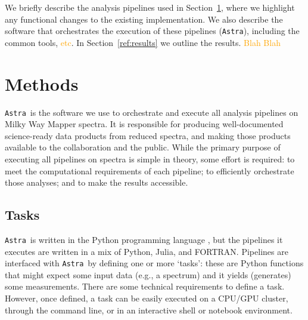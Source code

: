 \documentclass[modern]{aastex631}
\newcommand{\astra}{\texttt{Astra}}
\newcommand{\Astra}{\astra}
\newcommand{\todo}[1]{\textcolor{orange}{#1}}
\begin{document}
We briefly describe the analysis pipelines used in Section~\ref{sec:method}, where we highlight any functional changes to the existing implementation. We also describe the software that orchestrates the execution of these pipelines (\texttt{Astra}), including the common tools, \todo{etc}. In Section~\ref{ref:results} we outline the results. \todo{Blah Blah}

\section{Methods}\label{sec:method}

\Astra\ is the software we use to orchestrate and execute all analysis pipelines on Milky Way Mapper spectra. 
It is responsible for producing well-documented science-ready data products from reduced spectra, and making those products available to the collaboration and the public.
While the primary purpose of executing all pipelines on spectra is simple in theory, some effort is required: to meet the computational requirements of each pipeline; to efficiently orchestrate those analyses; and to make the results accessible.


\subsection{Tasks} \label{ref:tasks}

\Astra\ is written in the Python programming language \citep{python}, but the pipelines it executes are written in a mix of Python, Julia, and FORTRAN. 
Pipelines are interfaced with \Astra\ by defining one or more `tasks': these are Python functions that might expect some input data (e.g., a spectrum) and it yields (generates) some measurements.
There are some technical requirements to define a task.
However, once defined, a task can be easily executed on a CPU/GPU cluster, through the command line, or in an interactive shell or notebook environment.
\end{document}
